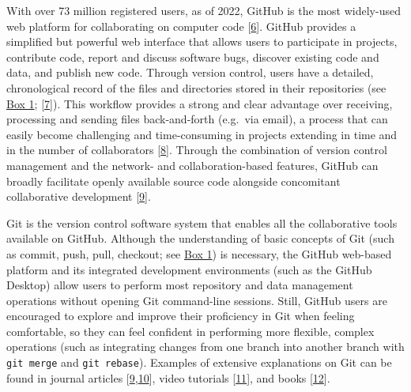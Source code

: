 With over 73 million registered users, as of 2022, GitHub is the most widely-used web platform for collaborating on computer code {[}\protect\hyperlink{ref-nwCtHDCn}{6}{]}.
GitHub provides a simplified but powerful web interface that allows users to participate in projects, contribute code, report and discuss software bugs, discover existing code and data, and publish new code.
Through version control, users have a detailed, chronological record of the files and directories stored in their repositories (see \protect\hyperlink{definitions}{Box 1}; {[}\protect\hyperlink{ref-RVetqmsg}{7}{]}).
This workflow provides a strong and clear advantage over receiving, processing and sending files back-and-forth (e.g.~via email), a process that can easily become challenging and time-consuming in projects extending in time and in the number of collaborators {[}\protect\hyperlink{ref-4ny1onB0}{8}{]}.
Through the combination of version control management and the network- and collaboration-based features, GitHub can broadly facilitate openly available source code alongside concomitant collaborative development {[}\protect\hyperlink{ref-kEX5dgzK}{9}{]}.

Git is the version control software system that enables all the collaborative tools available on GitHub.
Although the understanding of basic concepts of Git (such as commit, push, pull, checkout; see \protect\hyperlink{definitions}{Box 1}) is necessary, the GitHub web-based platform and its integrated development environments (such as the GitHub Desktop) allow users to perform most repository and data management operations without opening Git command-line sessions.
Still, GitHub users are encouraged to explore and improve their proficiency in Git when feeling comfortable, so they can feel confident in performing more flexible, complex operations (such as integrating changes from one branch into another branch with \texttt{git\ merge} and \texttt{git\ rebase}). Examples of extensive explanations on Git can be found in journal articles {[}\protect\hyperlink{ref-kEX5dgzK}{9},\protect\hyperlink{ref-PlcxShQU}{10}{]}, video tutorials {[}\protect\hyperlink{ref-NIS0JOW0}{11}{]}, and books {[}\protect\hyperlink{ref-13jOlVcpp}{12}{]}.

